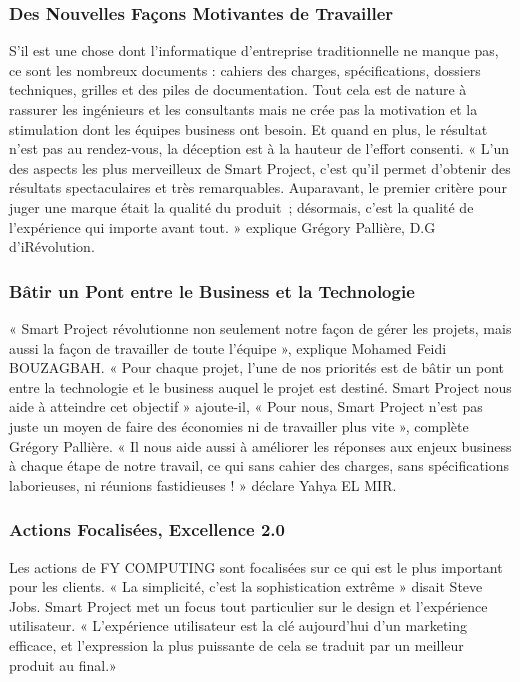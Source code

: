 \documentclass[a4paper,11pt,oneside]{report}
\begin{document}
\subsubsection*{Des Nouvelles Façons Motivantes de Travailler}
S’il est une chose dont l’informatique d’entreprise traditionnelle ne manque pas, ce sont les nombreux documents : cahiers des charges, spécifications, dossiers techniques, grilles et des piles de documentation. Tout cela est de nature à rassurer les ingénieurs et les consultants mais ne crée pas la motivation et la stimulation dont les équipes business ont besoin. Et quand en plus, le résultat n’est pas au rendez-vous, la déception est à la hauteur de l’effort consenti. « L’un des aspects les plus merveilleux de Smart Project, c’est qu’il permet d’obtenir des résultats spectaculaires et très remarquables. Auparavant, le premier critère pour juger une marque était la qualité du produit ; désormais, c’est la qualité de l’expérience qui importe avant tout. » explique Grégory Pallière, D.G d’iRévolution.

\subsubsection*{Bâtir un Pont entre le Business et la Technologie}
« Smart Project révolutionne non seulement notre façon de gérer les projets, mais aussi la façon de travailler de toute l’équipe », explique Mohamed Feidi BOUZAGBAH. « Pour chaque projet, l’une de nos priorités est de bâtir un pont entre la technologie et le business auquel le projet est destiné. Smart Project nous aide à atteindre cet objectif » ajoute-il, « Pour nous, Smart Project n’est pas juste un moyen de faire des économies ni de travailler plus vite », complète Grégory Pallière. « Il nous aide aussi à améliorer les réponses aux enjeux business à chaque étape de notre travail, ce qui sans cahier des charges, sans spécifications laborieuses, ni réunions fastidieuses ! » déclare Yahya EL MIR.

\subsubsection*{Actions Focalisées, Excellence 2.0}
Les actions de FY COMPUTING sont focalisées sur ce qui est le plus important pour les clients. « La simplicité, c’est la sophistication extrême » disait Steve Jobs. Smart Project met un focus tout particulier sur le design et l’expérience utilisateur. « L’expérience utilisateur est la clé aujourd’hui d’un marketing efficace, et l’expression la plus puissante de cela se traduit par un meilleur produit au final.»
\end{document}
